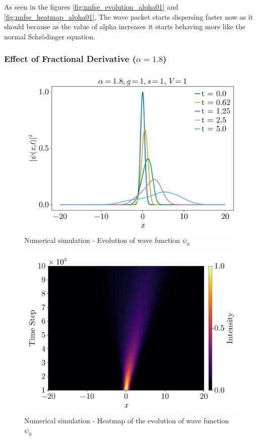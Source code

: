 \documentclass[8pt, a4paper, twocolumn]{article}
\begin{document}
As seen in the figures \ref{fig:nnfse_evolution_alpha01} and \ref{fig:nnfse_heatmap_alpha01}, The
wave packet starts dispersing faster now as it should because as the value of alpha increases it 
starts behaving more like the normal Schrödinger equation.

\subsubsection{Effect of Fractional Derivative ($\alpha = 1.8$)}

\begin{figure}[h!]
	\centering
	\includegraphics[width=\linewidth]{../figs/fnlse_evolution_02.pdf}
	\caption{Numerical simulation - Evolution of wave function $\psi_0$}
	\label{fig:nnfse_evolution_alpha02}
\end{figure}
\begin{figure}[h!]
	\centering
	\includegraphics[width=\linewidth]{../figs/fnlse_heatmap_02.pdf}
	\caption{Numerical simulation - Heatmap of the evolution of wave function $\psi_0$}
	\label{fig:nnfse_heatmap_alpha02}
\end{figure}
\end{document}
